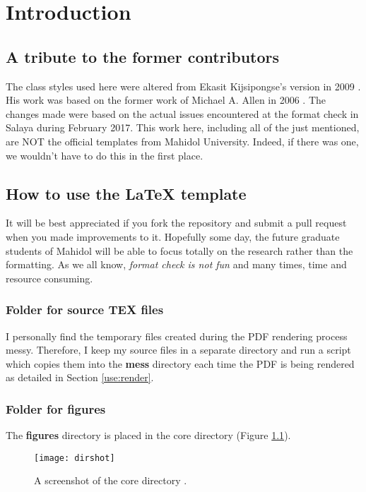\chapter{Introduction} \label{chap:intro}

\section{A tribute to the former contributors}
The class styles used here were altered from Ekasit Kijsipongse's version in 2009 \cite{EkasitMuThesis}.
His work was based on the former work of Michael A. Allen in 2006 \cite{allenMuThesis}.
The changes made were based on the actual issues encountered at the format check in Salaya during February 2017.
This work here, including all of the just mentioned, are NOT the official templates from Mahidol University. Indeed, if there was one, we wouldn't have to do this in the first place.


\section{How to use the LaTeX template} \label{sec:use}
It will be best appreciated if you fork the repository and submit a pull request when you made improvements to it.
Hopefully some day, the future graduate students of Mahidol will be able to focus totally on the research rather than the formatting. As we all know, \textit{format check is not fun} and many times, time and resource consuming.


\subsection{Folder for source TEX files} \label{use:source}
I personally find the temporary files created during the PDF rendering process messy. Therefore, I keep my source files in a separate directory and run a script which copies them into the \textbf{mess} directory each time the PDF is being rendered as detailed in Section \ref{use:render}.

\subsection{Folder for figures} \label{use:fig}
The \textbf{figures} directory is placed in the core directory (Figure \ref{fig:screenshot}).

\begin{figure}[!htpb]
    \centering
    \texttt{[image: dirshot]} %
    \caption[A screenshot of the core directory.]{A screenshot of the core directory \cite{hatioMuThesis}.} %
    \label{fig:screenshot}
\end{figure}


